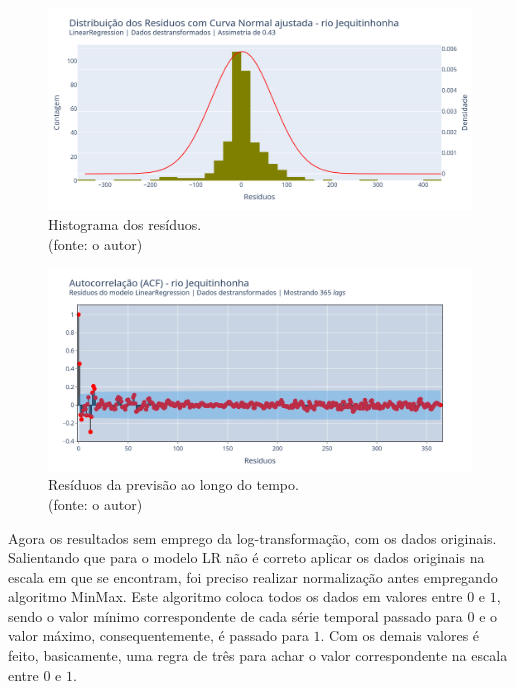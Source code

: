\begin{figure}[!h]
	\centering
	\includegraphics[scale=0.33]{Figuras/jequiti/wfv/LR/LR_WFV_LOG_RESID_x_CURVA_NORMAL.png}
	\caption{Histograma dos resíduos.\\(fonte: o autor)}
	\label{fig:jequiti_LR_WFV_LOG_RESID_x_CURVA_NORMAL}
\end{figure}

\begin{figure}[!h]
	\centering
	\includegraphics[scale=0.33]{Figuras/jequiti/wfv/LR/LR_WFV_LOG_RESID_ACF.png}
	\caption{Resíduos da previsão ao longo do tempo.\\(fonte: o autor)}
	\label{fig:jequiti_LR_WFV_LOG_RESID_ACF}
\end{figure}
\clearpage

Agora os resultados sem emprego da log-transformação, com os dados originais. Salientando que para o modelo LR não é correto aplicar os dados originais na escala em que se encontram, foi preciso realizar normalização antes empregando algoritmo MinMax. Este algoritmo coloca todos os dados em valores entre $0$ e $1$, sendo o valor mínimo correspondente de cada série temporal passado para $0$ e o valor máximo, consequentemente, é passado para $1$. Com os demais valores é feito, basicamente, uma regra de três para achar o valor correspondente na escala entre $0$ e $1$.

